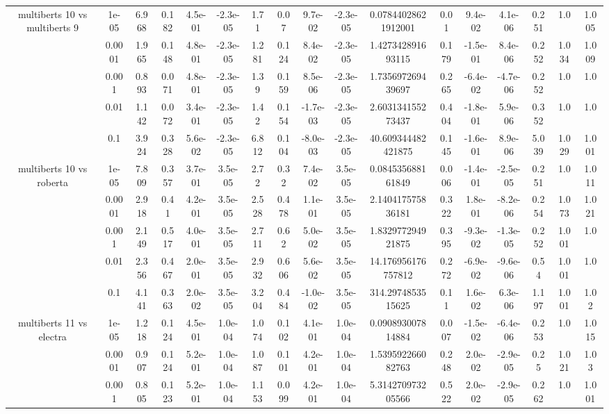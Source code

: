 \begin{tabular}{|c|c|c|c|c|c|c|c|c|c|c|c|c|c|c|c|c|}
\hline
\multirow{5}{*}{multiberts 10 vs multiberts 9} & 1e-05 & 6.968 & 0.182 & 4.5e-01 & -2.3e-05 & 1.71 & 0.07 & 9.7e-02 & -2.3e-05 & 0.07844028621912001 & 0.01 & 9.4e-02 & 4.1e-06 & 0.251 & 1.0 & 1.005 \\
 & 0.0001 & 1.965 & 0.148 & 4.8e-01 & -2.3e-05 & 1.281 & 0.124 & 8.4e-02 & -2.3e-05 & 1.427342891693115 & 0.179 & -1.5e-01 & 8.4e-06 & 0.252 & 1.034 & 1.009 \\
 & 0.001 & 0.893 & 0.071 & 4.8e-01 & -2.3e-05 & 1.39 & 0.159 & 8.5e-06 & -2.3e-05 & 1.735697269439697 & 0.265 & -6.4e-02 & -4.7e-06 & 0.252 & 1.0 & 1.0 \\
 & 0.01 & 1.142 & 0.072 & 3.4e-01 & -2.3e-05 & 1.42 & 0.154 & -1.7e-03 & -2.3e-05 & 2.603134155273437 & 0.404 & -1.8e-01 & 5.9e-06 & 0.352 & 1.0 & 1.0 \\
 & 0.1 & 3.924 & 0.328 & 5.6e-02 & -2.3e-05 & 6.812 & 0.104 & -8.0e-03 & -2.3e-05 & 40.609344482421875 & 0.145 & -1.6e-01 & 8.9e-06 & 5.039 & 1.029 & 1.001 \\
\hline
\multirow{5}{*}{multiberts 10 vs roberta } & 1e-05 & 7.809 & 0.357 & 3.7e-01 & 3.5e-05 & 2.72 & 0.32 & 7.4e-02 & 3.5e-05 & 0.084535688161849 & 0.006 & -1.4e-01 & -2.5e-05 & 0.251 & 1.0 & 1.011 \\
 & 0.0001 & 2.918 & 0.41 & 4.2e-01 & 3.5e-05 & 2.528 & 0.478 & 1.1e-01 & 3.5e-05 & 2.140417575836181 & 0.322 & 1.8e-01 & -8.2e-06 & 0.254 & 1.073 & 1.021 \\
 & 0.001 & 2.149 & 0.517 & 4.0e-01 & 3.5e-05 & 2.711 & 0.62 & 5.0e-02 & 3.5e-05 & 1.832977294921875 & 0.395 & -9.3e-02 & -1.3e-05 & 0.252 & 1.001 & 1.0 \\
 & 0.01 & 2.356 & 0.467 & 2.0e-01 & 3.5e-05 & 2.932 & 0.606 & 5.6e-02 & 3.5e-05 & 14.176956176757812 & 0.272 & -6.9e-02 & -9.6e-06 & 0.54 & 1.001 & 1.0 \\
 & 0.1 & 4.141 & 0.363 & 2.0e-02 & 3.5e-05 & 3.204 & 0.484 & -1.0e-02 & 3.5e-05 & 314.2974853515625 & 0.11 & 1.6e-02 & 6.3e-06 & 1.197 & 1.001 & 1.02 \\
\hline
\multirow{5}{*}{multiberts 11 vs electra } & 1e-05 & 1.218 & 0.124 & 4.5e-01 & 1.0e-04 & 1.074 & 0.102 & 4.1e-01 & 1.0e-04 & 0.090893007814884 & 0.007 & -1.5e-02 & -6.4e-06 & 0.253 & 1.0 & 1.015 \\
 & 0.0001 & 0.907 & 0.124 & 5.2e-01 & 1.0e-04 & 1.087 & 0.101 & 4.2e-01 & 1.0e-04 & 1.539592266082763 & 0.248 & 2.0e-02 & -2.9e-05 & 0.25 & 1.021 & 1.03 \\
 & 0.001 & 0.805 & 0.123 & 5.2e-01 & 1.0e-04 & 1.153 & 0.099 & 4.2e-01 & 1.0e-04 & 5.314270973205566 & 0.522 & 2.0e-02 & -2.9e-05 & 0.262 & 1.0 & 1.001 \\

\end{tabular}
